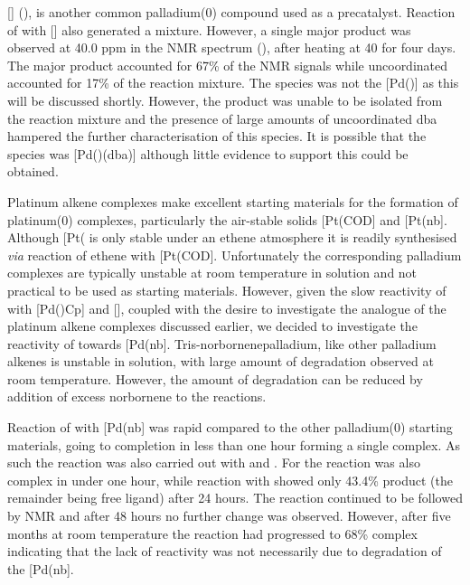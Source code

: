 [] (), is another common palladium(0) compound used as a precatalyst.  Reaction of \tButhixantphos{} with [] also generated a mixture.   However, a single major product was observed at 40.0 ppm in the \phosphorus{} NMR spectrum (), after heating at 40\degC{} for four days.  The major product accounted for 67\% of the \phosphorus{} NMR signals while uncoordinated \tButhixantphos{} accounted for 17\% of the reaction mixture.  The species was not the [Pd(\tButhixantphos)] as this will be discussed shortly.  However, the product was unable to be isolated from the reaction mixture and the presence of large amounts of uncoordinated dba hampered the further characterisation of this species.  It is possible that the species was [Pd(\tButhixantphos)(dba)] although little evidence to support this could be obtained.  

Platinum alkene complexes make excellent starting materials for the formation of platinum(0) complexes, particularly the air-stable solids [Pt(COD] and [Pt(nb].  Although [Pt(\ce{C2H4)3]} is only stable under an ethene atmosphere it is readily synthesised  \emph{via} reaction of ethene with [Pt(COD].  Unfortunately the corresponding palladium complexes are typically unstable at room temperature in solution and not practical to be used as starting materials.\cite{Green1977}  However, given the slow reactivity of \tButhixantphos{} with [Pd()Cp] and [], coupled with the desire to investigate the analogue of the platinum alkene complexes discussed earlier, we decided to investigate the reactivity of\tButhixantphos{} towards [Pd(nb].  Tris-norbornenepalladium, like other palladium alkenes is unstable in solution, with large amount of degradation observed at room temperature.  However, the amount of degradation can be reduced by addition of excess norbornene to the reactions.  

Reaction of \tButhixantphos{} with [Pd(nb] was rapid compared to the other palladium(0) starting materials, going to completion in less than one hour forming a single complex.  As such the reaction was also carried out with \tBusixantphos{} and \tBuxantphos{}.  For \tBuxantphos{} the reaction was also complex in under one hour, while reaction with \tBusixantphos{} showed only 43.4\% product (the remainder being free ligand) after 24 hours.  The reaction continued to be followed by NMR and after 48 hours no further change was observed.  However, after five months at room temperature the reaction had progressed to 68\% complex indicating that the lack of reactivity was not necessarily due to degradation of the [Pd(nb].  

